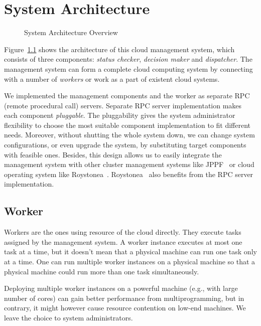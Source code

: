 \chapter{System Architecture}


\begin{figure}
  \centering
  
  \caption{System Architecture Overview}
  \label{fig:archi-overview}
\end{figure}

Figure~\ref{fig:archi-overview} shows the architecture of this cloud
management system, which consists of three components: \emph{status
checker}, \emph{decision maker} and \emph{dispatcher}.  The management
system can form a complete cloud computing system by connecting with a
number of \emph{workers} or work as a part of existent cloud systems.

We implemented the management components and the worker as separate RPC
(remote procedural call) servers.  Separate RPC server implementation
makes each component \emph{pluggable}.  The pluggability gives the
system administrator flexibility to choose the most suitable component
implementation to fit different needs.  Moreover, without shutting the
whole system down, we can change system configurations, or even upgrade
the system,  by substituting target components with feasible ones.
Besides, this design allows us to easily integrate the management system
with other cluster management systems like JPPF~\cite{cite:JPPF} or
cloud operating system like Roystonea~\cite{cite:roystonea}.
Roystonea~\cite{cite:roystonea} also benefits from the RPC server
implementation.



\section{Worker}

Workers are the ones using resource of the cloud directly.  They execute
tasks assigned by the management system.  A worker instance executes at
most one task at a time, but it doesn't mean that a physical machine can
run one task only at a time.  One can run multiple worker instances on a
physical machine so that a physical machine could run more than one task
simultaneously.	 

Deploying multiple worker instances on a powerful machine (e.g., with
large number of cores) can gain better performance from
multiprogramming, but in contrary, it might however cause resource
contention on low-end machines.  We leave the choice to system
administrators.  

